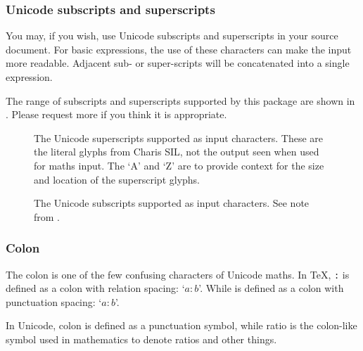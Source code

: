 \subsubsection{Unicode subscripts and superscripts}

You may, if you wish, use Unicode subscripts and superscripts in your
source document. For basic expressions, the use of these characters
can make the input more readable.
Adjacent sub- or super-scripts will be concatenated into a single
expression.

The range of subscripts and superscripts supported by this package
are shown in . Please request more if
you think it is appropriate.

\begin{figure}\centering
{}
\caption{
  The Unicode superscripts supported as input characters.
  These are the literal glyphs from Charis SIL,
  not the output seen when used for maths input.
  The `A' and `Z' are to provide context for the size and
  location of the superscript glyphs.
}
\end{figure}

\begin{figure}\centering
{}
\caption{
  The Unicode subscripts supported as input characters.
  See note from .
}
\end{figure}

\subsubsection{Colon}

The colon is one of the few confusing characters of Unicode maths.
In \TeX, \texttt{:} is defined as a colon with relation spacing: `$a:b$'.
While  is defined as a colon with punctuation spacing: `$a\colon b$'.

In Unicode,  {colon} is defined as a punctuation symbol,
while  {ratio} is the colon-like symbol used in mathematics to denote
ratios and other things.

